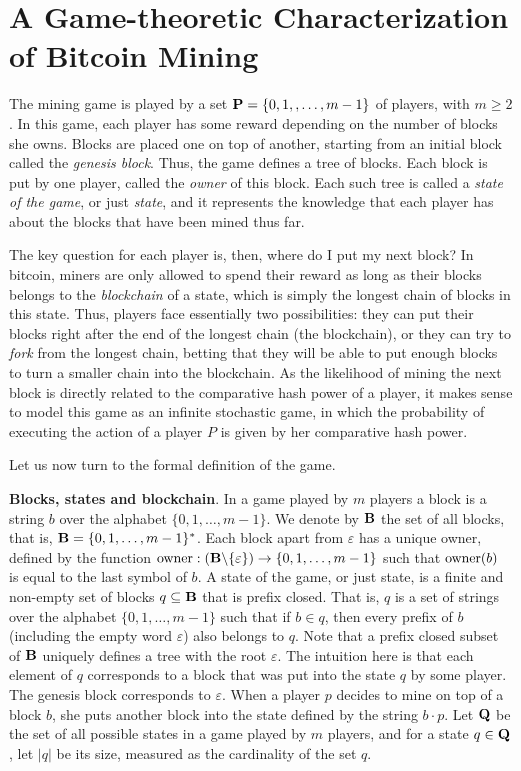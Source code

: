 
\section{A Game-theoretic Characterization of Bitcoin Mining}
\label{sec-formalization}

The mining game is played by a set $\mathbf{P} = \{0, 1, , \ldots, m-1\}$ of players, with $m \geq 2$.
In this game, each player has some reward depending on the number of blocks she owns. Blocks are placed one on top of another, starting from an initial block called the {\em genesis block}. Thus, the game defines a tree of blocks. Each block is put by one player, called the {\em owner} of this block. Each such tree is called a {\em state of the game}, or just {\em state}, and it represents the knowledge that each player has about the blocks that have been mined thus far. 

The key question for each player is, then, where do I put my next block? In bitcoin, miners are only allowed to spend their reward as long 
as their blocks belongs to the \emph{blockchain} of a state, which is simply the longest chain of blocks in this state. Thus, players face essentially two possibilities: they can put their blocks right after the end of the longest chain (the blockchain), or they can try to \emph{fork} 
from the longest chain, betting that they will be able to put enough blocks to turn a smaller chain into the blockchain. As the likelihood of 
mining the next block is directly related to the comparative hash power of a player, it makes sense to model this game as an infinite 
stochastic game, in which the probability of executing the action of a player $P$ is given by her comparative hash power. 

Let us now turn to the formal definition of the game. 

\medskip
\noindent
\textbf{Blocks, states and blockchain}. In a game played by $m$ players a block is a string $b$ over the alphabet $\{0,1,\ldots, m-1\}$. We denote by $\mathbf{B}$ the set of all blocks, that is, $\mathbf{B} = \{0,1,\ldots , m-1\}^*$. Each block apart from $\varepsilon$ has a unique owner, defined by the function $\text{\rm owner}: (\mathbf{B} \backslash \{\varepsilon\}) \rightarrow \{0,1, \ldots ,m-1\}$ such that $\text{\rm owner}(b)$ is equal to the last symbol of $b$. A state of the game, or just state,  is a finite and non-empty set of blocks $q \subseteq \mathbf{B}$ that is prefix closed. That is, $q$ is a set of strings over the alphabet $\{0,1,\ldots, m-1\}$ such that if $b\in q$, then every prefix of $b$ (including the empty word $\varepsilon$) also belongs to $q$. Note that a prefix closed subset of $\mathbf{B}$ uniquely defines a tree with the root $\varepsilon$. 
%
The intuition here is that each element of $q$ corresponds to a block that was put into the state $q$ by some player. The genesis block corresponds to $\varepsilon$. When a player $p$ decides to mine on top of a block $b$, she puts another block into the state defined by the string $b\cdot p$.
%
Let $\mathbf{Q}$ be the set of all possible states in a game played by $m$ players, and for a state $q \in \mathbf{Q}$, let $|q|$ be its size, measured as the cardinality of the set $q$. 

